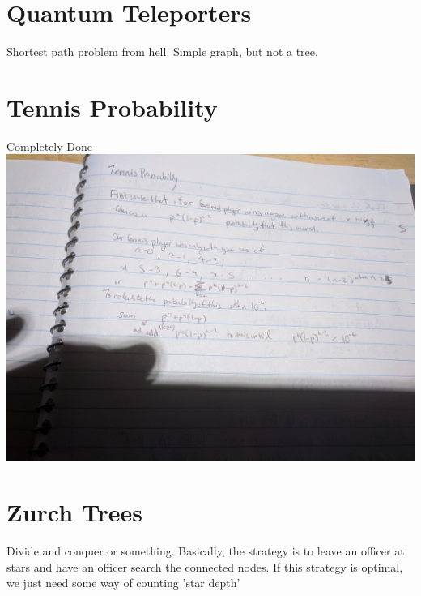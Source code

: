 \documentclass{article}
\begin{document}
\section{Quantum Teleporters}
Shortest path problem from hell. Simple graph, but not a tree.


\section{Tennis Probability}
Completely Done
\includegraphics[width=.75\textwidth]{tennisprob}

\section{Zurch Trees}
Divide and conquer or something. Basically, the strategy is to leave an officer at stars and have an officer search the connected nodes. If this strategy is optimal, we just need some way of counting 'star depth'
\end{document}
